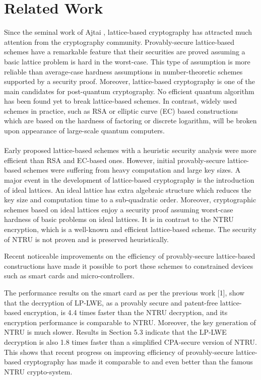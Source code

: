 \documentclass[conference]{IEEEtran}
\begin{document}
\section{Related Work}
Since the seminal work of Ajtai , lattice-based cryptography has attracted much attention
from the cryptography community. Provably-secure lattice-based schemes have a remarkable feature
that their securities are proved assuming a basic lattice problem is hard in the worst-case. This type
of assumption is more reliable than average-case hardness assumptions in number-theoretic schemes
supported by a security proof. Moreover, lattice-based cryptography is one of the main candidates
for post-quantum cryptography. No efficient quantum algorithm has been found yet to break lattice-based
schemes. In contrast, widely used schemes in practice, such as RSA or elliptic curve (EC) based constructions which are based on the hardness of factoring or discrete logarithm, will be broken upon
appearance of large-scale quantum computers.\\
\\
Early proposed lattice-based schemes with a heuristic security analysis were more
efficient than RSA and EC-based ones. However, initial provably-secure lattice-based schemes were
suffering from heavy computation and large key sizes. A major event in the development of lattice-based
cryptography is the introduction of ideal lattices. An ideal lattice has extra algebraic structure
which reduces the key size and computation time to a sub-quadratic order. Moreover, cryptographic
schemes based on ideal lattices enjoy a security proof assuming worst-case hardness of basic problems
on ideal lattices. It is in contrast to the NTRU encryption, which is a well-known and efficient
lattice-based scheme. The security of NTRU is not proven and is preserved heuristically.

\vspace{2mm}

Recent noticeable improvements on the efficiency of provably-secure lattice-based constructions
have made it possible to port these schemes to constrained devices such as smart cards and micro-controllers.

\vspace{2mm}

The performance results on the smart card as per the previous work [1], show that the decryption of LP-LWE, as a provably secure
and patent-free lattice-based encryption, is 4.4 times faster than the NTRU decryption, and its encryption performance is comparable to NTRU. Moreover, the key generation of NTRU is much
slower. Results in Section 5.3 indicate that the LP-LWE decryption is also 1.8 times faster than a
simplified CPA-secure version of NTRU. This shows that recent progress on improving efficiency of
provably-secure lattice-based cryptography has made it comparable to and even better than the famous
NTRU crypto-system.
\end{document}
